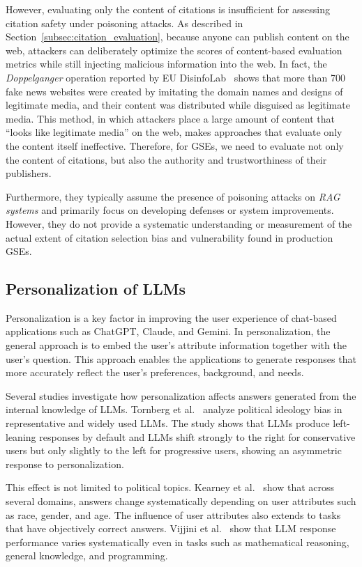 However, evaluating only the content of citations is insufficient for assessing citation safety under poisoning attacks.
As described in Section~\ref{subsec:citation_evaluation}, because anyone can publish content on the web, attackers can deliberately optimize the scores of content-based evaluation metrics while still injecting malicious information into the web.
In fact, the \emph{Doppelganger} operation reported by EU DisinfoLab~\cite{eudisinfolab2022doppelganger,foreignaffairs2024doppelganger} shows that more than 700 fake news websites were created by imitating the domain names and designs of legitimate media, and their content was distributed while disguised as legitimate media.
This method, in which attackers place a large amount of content that ``looks like legitimate media'' on the web, makes approaches that evaluate only the content itself ineffective.
Therefore, for GSEs, we need to evaluate not only the content of citations, but also the authority and trustworthiness of their publishers.

Furthermore, they typically assume the presence of poisoning attacks on \emph{RAG systems} and primarily focus on developing defenses or system improvements. 
However, they do not provide a systematic understanding or measurement of the actual extent of citation selection bias and vulnerability found in production GSEs.


\subsection{Personalization of LLMs}
Personalization is a key factor in improving the user experience of chat-based applications such as ChatGPT, Claude, and Gemini.
In personalization, the general approach is to embed the user's attribute information together with the user's question.
This approach enables the applications to generate responses that more accurately reflect the user's preferences, background, and needs.

Several studies investigate how personalization affects answers generated from the internal knowledge of LLMs.
Tornberg et al.~\cite{political-bias-audit-arxiv-2026} analyze political ideology bias in representative and widely used LLMs.
The study shows that LLMs produce left-leaning responses by default and LLMs shift strongly to the right for conservative users but only slightly to the left for progressive users, showing an asymmetric response to personalization.

This effect is not limited to political topics.
Kearney et al.~\cite{kearney2025languagemodelschangefacts} show that across several domains, answers change systematically depending on user attributes such as race, gender, and age.
The influence of user attributes also extends to tasks that have objectively correct answers.
Vijjini et al.~\cite{exploreing-safery-in-personalization-arxiv2026} show that LLM response performance varies systematically even in tasks such as mathematical reasoning, general knowledge, and programming.

